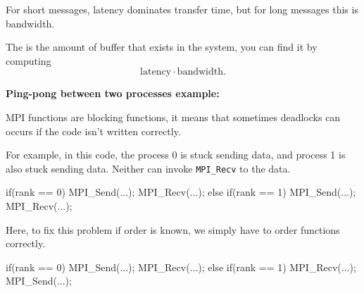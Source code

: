     For short messages, latency dominates transfer time, but for long messages this is bandwidth. 
    \begin{tcolorbox}[vert]
        The  is the amount of buffer that exists in the system, you can find it by computing 
        \[\text{latency} \cdot  \text{bandwidth}.\]
    \end{tcolorbox}
    \begin{tcolorbox}[rouge]
        \textbf{Ping-pong between two processes example:}
\begin{codeCenter}
\end{codeCenter}
    \end{tcolorbox}
    \newpage 
    MPI functions are blocking functions, it means that sometimes deadlocks can occurs if the code isn't written correctly.
    \begin{image}{For example, in this code, the process 0 is stuck sending data, and process 1 is also stuck sending data. Neither can invoke \lstinline!MPI_Recv! to the data.}
        \begin{codeCenter}
        \begin{Ccode}
if(rank == 0){
    MPI_Send(...);
    MPI_Recv(...);
} else if(rank == 1){
    MPI_Send(...);
    MPI_Recv(...);
}
        \end{Ccode}
        \end{codeCenter}
    \end{image}
    \begin{image}{Here, to fix this problem if order is known, we simply have to order functions correctly.}
        \begin{codeCenter}
        \begin{Ccode}
if(rank == 0){
    MPI_Send(...);
    MPI_Recv(...);
} else if(rank == 1){
    MPI_Recv(...);
    MPI_Send(...);
}
        \end{Ccode}
        \end{codeCenter}
    \end{image}
